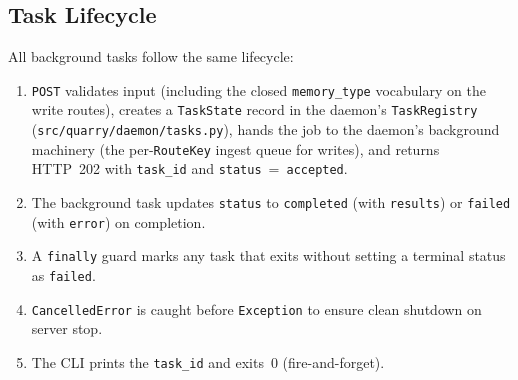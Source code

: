 \documentclass[a4paper,10pt]{article}
\newcommand{\modpath}[1]{\texttt{src/quarry/#1}}
\newcommand{\field}[1]{\texttt{#1}}
\begin{document}
\subsection{Task Lifecycle}

All background tasks follow the same lifecycle:

\begin{enumerate}
  \item \texttt{POST} validates input (including the closed
    \texttt{memory\_type} vocabulary on the write routes), creates a
    \texttt{TaskState} record in the daemon's \texttt{TaskRegistry}
    (\modpath{daemon/tasks.py}), hands the job to the daemon's background
    machinery (the per-\texttt{RouteKey} ingest queue for writes), and
    returns HTTP~202 with \field{task\_id} and
    \field{status}~=~\texttt{accepted}.
  \item The background task updates \field{status} to
    \texttt{completed} (with \field{results}) or \texttt{failed}
    (with \field{error}) on completion.
  \item A \texttt{finally} guard marks any task that exits without
    setting a terminal status as \texttt{failed}.
  \item \texttt{CancelledError} is caught before \texttt{Exception}
    to ensure clean shutdown on server stop.
  \item The CLI prints the \field{task\_id} and exits~0 (fire-and-forget).
\end{enumerate}
\end{document}
